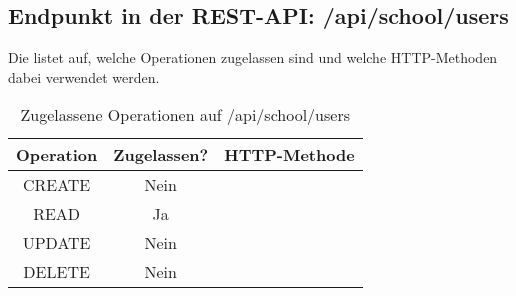 \subsection{Endpunkt in der REST-API: /api/school/users}
Die  listet auf, welche Operationen zugelassen sind und welche HTTP-Methoden dabei verwendet werden. 

\begin{table}[!htbp]
	\begin{tabular}{|c|c|c|}
		\hline
			\textbf{Operation} & \textbf{Zugelassen?} & \textbf{HTTP-Methode} \\ \hline
			CREATE & Nein & \\ \hline 
			READ & Ja &  \\ \hline
			UPDATE & Nein & \\ \hline 
			DELETE & Nein & \\ \hline
	\end{tabular}

		\caption{Zugelassene Operationen auf /api/school/users}
		\label{tab:end:rest:api:school:users:meth}
\end{table}



